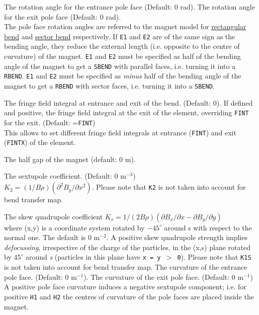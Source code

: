 \begin{madlist}
    The rotation angle for the entrance pole face (Default: 0 rad).
    The rotation angle for the exit pole face (Default: 0 rad). \\
   The pole face rotation angles are referred to the magnet model for
   \hyperref[F-RBND]{rectangular bend} and \hyperref[F-SBND]{sector
     bend} respectively. If \texttt{E1} and \texttt{E2} are of the same sign as the bending angle, they reduce the external length (i.e. opposite to the centre of curvature) of the magnet. \texttt{E1} and \texttt{E2} must be specified as half of the bending angle of the magnet to get a \texttt{SBEND} with parallel faces, i.e. turning it into a \texttt{RBEND}. \texttt{E1} and \texttt{E2} must be specified as {\it minus} half of the bending angle of the magnet to get a \texttt{RBEND} with sector faces, i.e. turning it into a \texttt{SBEND}.

    The fringe field integral at entrance and exit of the
   bend. (Default:  0).
    If defined and positive, the fringe field integral at
   the exit of the element, overriding \texttt{FINT} for the
   exit. (Default: =\texttt{FINT}) \\
   This allows to set different fringe field integrals at entrance
   (\texttt{FINT}) and exit (\texttt{FINTX}) of the element.

    The half gap of the magnet (default: 0 m).

    The sextupole coefficient. (Default: 0 m$^{-3}$) \\
   $K_2 = (1/B\rho) (\partial^2 B_y / \partial x^2)$. Please note that \texttt{K2}
   is not taken into account for bend transfer map.

   The skew quadrupole coefficient
   $K_{s} = 1/(2 B \rho) (\partial B_x / \partial x - \partial B_y / \partial y)$\\
    where (x,y) is a coordinate system rotated by $-45^\circ$ around s
    with respect to the normal one. The default is 0 m$^{-2}$. A
    positive skew quadrupole strength implies \textsl{defocussing},
    irrespective of the charge of the particles,
    in the (x,s) plane rotated by $45^\circ$
    around \textit{s} (particles in this plane have \texttt{x = y $>$ 0}).
    Please note that \texttt{K1S} is not taken into account for bend transfer map.
   The curvature of the entrance pole face.
   (Default: 0 m$^{-1}$).
    The curvature of the exit pole face. (Default: 0 m$^{-1}$) \\
   A positive pole face curvature induces a negative sextupole
   component; i.e. for positive \texttt{H1} and \texttt{H2} the centres
   of curvature of the pole faces are placed inside the magnet.


\end{madlist}
